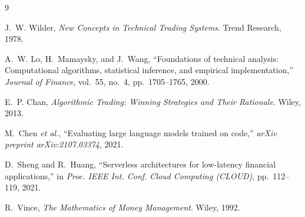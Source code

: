 \documentclass[conference]{IEEEtran}
\begin{document}
\begin{thebibliography}{9}

J.~W. Wilder, \textit{New Concepts in Technical Trading Systems}.
Trend Research, 1978.

A.~W. Lo, H.~Mamaysky, and J.~Wang, ``Foundations of technical
analysis: Computational algorithms, statistical inference, and
empirical implementation,'' \textit{Journal of Finance}, vol.~55,
no.~4, pp.~1705--1765, 2000.

E.~P. Chan, \textit{Algorithmic Trading: Winning Strategies and
Their Rationale}. Wiley, 2013.

M.~Chen \textit{et al.}, ``Evaluating large language models trained
on code,'' \textit{arXiv preprint arXiv:2107.03374}, 2021.

D.~Sheng and R.~Huang, ``Serverless architectures for low-latency
financial applications,'' in \textit{Proc. IEEE Int. Conf. Cloud
Computing (CLOUD)}, pp.~112--119, 2021.

R.~Vince, \textit{The Mathematics of Money Management}.
Wiley, 1992.

\end{thebibliography}
\end{document}
